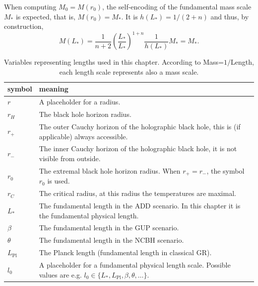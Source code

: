 \documentclass[12pt,a4paper]{report}
\numberwithin{equation}{chapter}
\begin{document}
When computing $M_0=M(r_0)$, the self-encoding of the fundamental mass scale $M_*$ is expected, that is, $M(r_0) = M_*$. It is $h(L_*) = 1/(2+n)$ and thus, by construction,
\begin{equation}
M(L_*) = \frac{1}{n+2} \left( \frac{L_*}{L_*} \right)^{1+n} \frac{1}{h(L_*)} M_* =  M_*.
\end{equation}
%

\begin{table}
\begin{tabularx}{\linewidth}{ l X }
\firsthline
symbol & meaning \\
\hline
$r$   & A placeholder for a radius. \\
$r_H$ & The black hole horizon radius. \\
$r_+$ & The outer Cauchy horizon of the holographic black hole, this is (if applicable) always accessible. \\
$r_-$ & The inner Cauchy horizon of the holographic black hole, it is not visible from outside. \\
$r_0$ & The extremal black hole horizon radius. When $r_+ = r_-$, the symbol $r_0$ is used. \\
$r_C$ & The critical radius, at this radius the temperatures are maximal. \\
$L_*$  & The fundamental length in the ADD scenario. In this chapter it is the fundamental physical length. \\
$\beta$ & The fundamental length in the GUP scenario. \\
$\theta$ & The fundamental length in the NCBH scenario. \\
$L_\text{Pl}$ & The Planck length (fundamental length in classical GR). \\
$l_0$ & A placeholder for a fundamental physical length scale. Possible values are e.g. $l_0\in \{L_*, L_\text{Pl}, \beta, \theta, \dots \}$. \\
\hline
\end{tabularx}
\caption[Overview table for length variables like $r_H, r_0, r_C, L_*, l_0, \dots$]{Variables representing lengths used in this chapter. According to Mass=$1/$Length, each length scale represents also a mass scale.}
\end{table}
\end{document}
